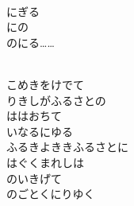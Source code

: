 \documentclass[10pt,b5j]{tarticle} %
\begin{document}
\vspace{1.5em} %
\newcommand{\linespace}{0.5em} %
\newcommand{\blocksize}{0.5\hsize} %
\newcommand{\itemmargin}{3em} %
\begin{enumerate} %
    \setlength{\itemindent}{\itemmargin} %
    \begin{minipage}[c]{\blocksize}
    
        \vspace{\linespace}
        \item~\\
        にぎる\\
        にの\\
        のにる……
        
    \end{minipage}
    \begin{minipage}[c]{\blocksize}
        
        \vspace{\linespace}
        \item~\\
        こめきをけでて\\
        りきしがふるさとの\\
        ははおちて\\
        いなるにゆる\\
        ふるきよききふるさとに\\
        はぐくまれしは\\
        のいきげて\\
        のごとくにりゆく
        
    \end{minipage}
    \begin{minipage}[c]{\blocksize}
        

\end{minipage}
\end{enumerate}
\end{document}
